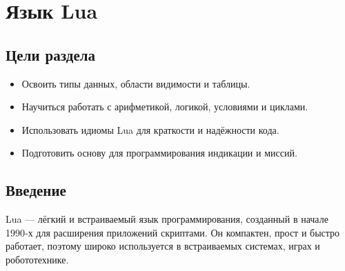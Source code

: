 \section{Язык Lua}
\subsection*{Цели раздела}
\begin{itemize}
  \item Освоить типы данных, области видимости и таблицы.
  \item Научиться работать с арифметикой, логикой, условиями и циклами.
  \item Использовать идиомы Lua для краткости и надёжности кода.
  \item Подготовить основу для программирования индикации и миссий.
\end{itemize}
\subsection{Введение}
Lua — лёгкий и встраиваемый язык программирования, созданный в начале 1990‑х для расширения приложений скриптами. Он компактен, прост и быстро работает, поэтому широко используется в встраиваемых системах, играх и робототехнике.

